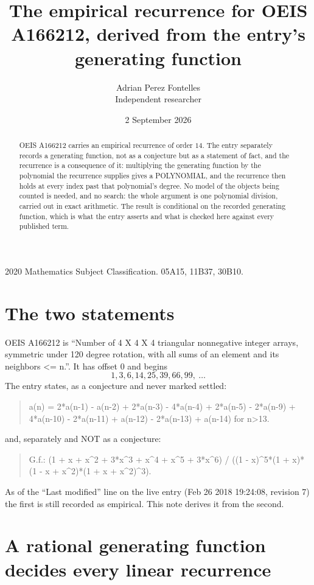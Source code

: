\documentclass[11pt,a4paper]{article}
\title{The empirical recurrence for OEIS A166212, derived from the entry's generating function}
\author{Adrian Perez Fontelles\\ \small Independent researcher}
\date{2 September 2026}
\theoremstyle{plain}
\theoremstyle{definition}
\begin{document}
\maketitle

\begin{abstract}
OEIS A166212 carries an empirical recurrence of order $14$. The entry separately records a
generating function, not as a conjecture but as a statement of fact, and the recurrence is a
consequence of it: multiplying the generating function by the polynomial the recurrence
supplies gives a POLYNOMIAL, and the recurrence then holds at every index past that
polynomial's degree. No model of the objects being counted is needed, and no search: the
whole argument is one polynomial division, carried out in exact arithmetic. The result is
conditional on the recorded generating function, which is what the entry asserts and what is
checked here against every published term.
\end{abstract}

\noindent\small 2020 Mathematics Subject Classification. 05A15, 11B37, 30B10.\normalsize

\section{The two statements}

OEIS A166212 is ``Number of 4 X 4 X 4 triangular nonnegative integer arrays, symmetric under 120 degree rotation, with all sums of an element and its neighbors <= n.''. It has offset $0$ and begins
\[
1, 3, 6, 14, 25, 39, 66, 99,\ \dots
\]
The entry states, as a conjecture and never marked settled:
\begin{quote}
a(n) = 2*a(n-1) - a(n-2) + 2*a(n-3) - 4*a(n-4) + 2*a(n-5) - 2*a(n-9) + 4*a(n-10) - 2*a(n-11) + a(n-12) - 2*a(n-13) + a(n-14) for n>13.
\end{quote}
and, separately and NOT as a conjecture:
\begin{quote}
G.f.: (1 + x + x\^{}2 + 3*x\^{}3 + x\^{}4 + x\^{}5 + 3*x\^{}6) / ((1 - x)\^{}5*(1 + x)*(1 - x + x\^{}2)*(1 + x + x\^{}2)\^{}3).
\end{quote}
As of the ``Last modified'' line on the live entry (Feb 26 2018 19:24:08, revision 7) the first is still
recorded as empirical. This note derives it from the second.

\section{A rational generating function decides every linear recurrence}
\end{document}
